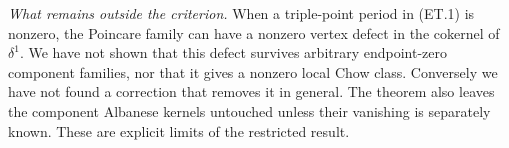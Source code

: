 \emph{What remains outside the criterion.}
When a triple-point period in (ET.1) is nonzero, the Poincare family
can have a nonzero vertex defect in the cokernel of $\delta^1$.
We have not shown that this defect survives arbitrary endpoint-zero
component families, nor that it gives a nonzero local Chow class.
Conversely we have not found a correction that removes it in general.
The theorem also leaves the component Albanese kernels untouched
unless their vanishing is separately known. These are explicit
limits of the restricted result.
